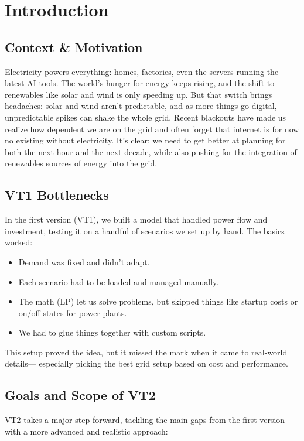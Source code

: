\newpage
\section{Introduction}

\subsection{Context \& Motivation}
Electricity powers everything: homes, factories, even the servers running the latest 
AI tools. The world's hunger for energy keeps rising, and the shift to renewables 
like solar and wind is only speeding up. But that switch brings headaches: solar and 
wind aren't predictable, and as more things go digital, unpredictable spikes can shake 
the whole grid. Recent blackouts have made us realize how dependent we are on 
the grid and often forget that internet is for now no existing without electricity.
It's clear: we need to get better at planning for both the next hour and the next decade, 
while also pushing for the integration of renewables sources of energy into the grid.

\subsection{VT1 Bottlenecks}
In the first version (VT1), we built a model that handled power flow and investment, 
testing it on a handful of scenarios we set up by hand. The basics worked:
\begin{itemize}
    \item Demand was fixed and didn’t adapt.
    \item Each scenario had to be loaded and managed manually.
    \item The math (LP) let us solve problems, but skipped things like startup costs or 
    on/off states for power plants.
    \item We had to glue things together with custom scripts.
\end{itemize}
This setup proved the idea, but it missed the mark when it came to real-world details—
especially picking the best grid setup based on cost and performance.

\subsection{Goals and Scope of VT2}
VT2 takes a major step forward, tackling the main gaps from the first version 
with a more advanced and realistic approach:

